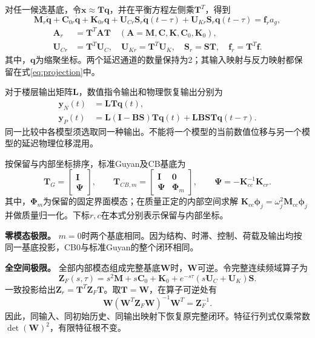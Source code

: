 \documentclass[UTF8,11pt,a4paper]{ctexart}
\newcommand{\mat}[1]{\bm{#1}}
\begin{document}
对任一候选基底，令$\mat x\approx\mat T\mat q$，并在平衡方程左侧乘$\mat T^T$，得到
\begin{equation}\label{eq:reduced}
 \mat M_r\ddot{\mat q}+\mat C_{0r}\dot{\mat q}+\mat K_{0r}\mat q
 +\mat U_{Cr}\mat S_r\dot{\mat q}(t-\tau)
 +\mat U_{Kr}\mat S_r\mat q(t-\tau)=\mat f_r a_g,
\end{equation}
\begin{align}
 \mat A_r&=\mat T^T\mat A\mat T\quad(\mat A=\mat M,\mat C,\mat K,\mat C_0,\mat K_0),\\
 \mat U_{Cr}&=\mat T^T\mat U_C,\quad
 \mat U_{Kr}=\mat T^T\mat U_K,\quad
 \mat S_r=\mat S\mat T,\quad \mat f_r=\mat T^T\mat f.\label{eq:projection}
\end{align}
其中，$\mat q$为缩聚坐标。两个延迟通道的数量保持为2；其输入映射与反力映射都保留在式\eqref{eq:projection}中。

对于楼层输出矩阵$\mat L$，数值指令输出和物理恢复输出分别为
\begin{align}
 \mat y_N(t)&=\mat L\mat T\mat q(t),\\
 \mat y_P(t)&=\mat L(\mat I-\mat B\mat S)\mat T\mat q(t)
 +\mat L\mat B\mat S\mat T\mat q(t-\tau).\label{eq:output}
\end{align}
同一比较中各模型须选取同一种输出。不能将一个模型的当前数值位移与另一个模型的延迟物理位移混用。

按保留与内部坐标排序，标准Guyan及CB基底为
\begin{equation}\label{eq:basis}
 \mat T_G=\begin{bmatrix}\mat I\\\mat\Psi\end{bmatrix},\qquad
 \mat T_{CB,m}=\begin{bmatrix}\mat I&\mat0\\\mat\Psi&\mat\Phi_m\end{bmatrix},\qquad
 \mat\Psi=-\mat K_{cc}^{-1}\mat K_{cr}.
\end{equation}
其中，$\mat\Phi_m$为保留的固定界面模态；在质量正定的内部空间求解
$\mat K_{cc}\mat\phi_j=\omega_j^2\mat M_{cc}\mat\phi_j$并做质量归一化。下标$r,c$在本式分别表示保留与内部坐标。

\textbf{零模态极限。} $m=0$时两个基底相同。因为结构、时滞、控制、荷载及输出均按同一基底投影，CB0与标准Guyan的整个闭环相同。

\textbf{全空间极限。} 全部内部模态组成完整基底$\mat W$时，$\mat W$可逆。令完整连续频域算子为
\begin{equation}\label{eq:continuous}
 \mat Z_F(s,\tau)=s^2\mat M+s\mat C_0+\mat K_0
 +e^{-s\tau}(s\mat U_C+\mat U_K)\mat S.
\end{equation}
一致投影给出$\mat Z_r=\mat T^T\mat Z_F\mat T$。取$\mat T=\mat W$，在算子可逆处有
\begin{equation}\label{eq:fullspace}
 \mat W(\mat W^T\mat Z_F\mat W)^{-1}\mat W^T=\mat Z_F^{-1}.
\end{equation}
因此，同输入、同初始历史、同输出映射下恢复原完整闭环。特征行列式仅乘常数$\det(\mat W)^2$，有限特征根不变。
\end{document}
